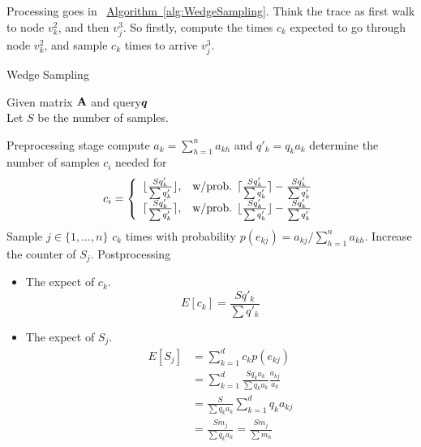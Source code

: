 \documentclass{article}
\newcommand{\V}[1]{{\bm{{\MakeLowercase{#1}}}}}%
\newcommand{\M}[1]{{\bm{\mathbf{\MakeUppercase{#1}}}}}%
\newcommand{\Alg}[1]{\hyperref[alg:#1]{Algorithm~\ref*{alg:#1}}}
\begin{document}
Processing goes in ~\Alg{WedgeSampling}. Think the trace as first walk to node $v_k^2$, and then $v_j^3$. So firstly, compute the times $c_k$ expected to go through node $v_k^2$, and sample $c_k$ times to arrive $v_j^3$.
\begin{algorithm}[t]
    \caption{Wedge Sampling}
    \label{alg:WedgeSampling}
    Given  matrix $\M{A}$ and query$\V{q}$\\
    Let $S$ be the number of samples.
    \begin{algorithmic}[1]
    \State Preprocessing stage
    \State compute $a_k = \sum_{h=1}^{n}a_{kh}$ and $q'_k = q_ka_k$
    \EndFor
     determine the number of samples $c_i$ needed for
    \State
    \begin{equation*}c_i=
    \left\{
      \begin{array}{ll}
        \lfloor \frac{Sq'_k}{\sum q'_k} \rfloor,
        & \hbox{w/prob. $\lceil \frac{Sq'_k}{\sum q'_k} \rceil - \frac{Sq'_k}{\sum q'_k}$} \\
        \lceil \frac{Sq'_k}{\sum q'_k} \rceil,
        & \hbox{w/prob. $\lfloor \frac{Sq'_k}{\sum q'_k} \rfloor - \frac{Sq'_k}{\sum q'_k}$}
      \end{array}
    \right.
    \end{equation*}
    \EndFor
    \State  \label{line:edge}
    Sample $j\in \{1,\ldots,n\}$ $c_k$ times with probability
    $p(e_{kj}) = a_{kj}/\sum_{h=1}^{n}a_{kh}$.
    \State Increase the counter of $S_j$.
    \EndFor
    \State Postprocessing
    \end{algorithmic}
\end{algorithm}

\begin{itemize}
  \item The expect of $c_k$.
        \[ E[c_k] = \frac{Sq'_k}{\sum q'_k}\]
  \item The expect of $S_j$.
        \begin{align*}
        E[S_j] &= \sum_{k=1}^{d} c_kp(e_{kj})\\
               &= \sum_{k=1}^{d} \frac{Sq_ka_k}{\sum q_ka_k}\frac{a_{kj}}{a_k}\\
               &= \frac{S}{{\sum q_ka_k}}\sum_{k=1}^{d}q_ka_{kj}\\
               &= \frac{Sm_j}{{\sum q_ka_k}}= \frac{Sm_j}{{\sum m_h}}
        \end{align*}
\end{itemize}
\end{document}
